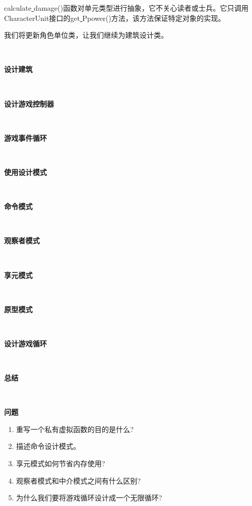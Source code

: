 calculate\underline{ }damage()函数对单元类型进行抽象，它不关心读者或士兵。它只调用CharacterUnit接口的get\underline{ }Ppower()方法，该方法保证特定对象的实现。\par
我们将更新角色单位类，让我们继续为建筑设计类。 \par

\noindent\textbf{}\ \par
\textbf{设计建筑} \ \par

\noindent\textbf{}\ \par
\textbf{设计游戏控制器} \ \par

\noindent\textbf{}\ \par
\textbf{游戏事件循环} \ \par

\noindent\textbf{}\ \par
\textbf{使用设计模式} \ \par

\noindent\textbf{}\ \par
\textbf{命令模式} \ \par

\noindent\textbf{}\ \par
\textbf{观察者模式} \ \par

\noindent\textbf{}\ \par
\textbf{享元模式} \ \par

\noindent\textbf{}\ \par
\textbf{原型模式} \ \par

\noindent\textbf{}\ \par
\textbf{设计游戏循环} \ \par

\noindent\textbf{}\ \par
\textbf{总结} \ \par

\noindent\textbf{}\ \par
\textbf{问题} \ \par
\begin{enumerate}
	\item 重写一个私有虚拟函数的目的是什么?
	\item 描述命令设计模式。
	\item 享元模式如何节省内存使用?
	\item 观察者模式和中介模式之间有什么区别?
	\item 为什么我们要将游戏循环设计成一个无限循环?
\end{enumerate}

